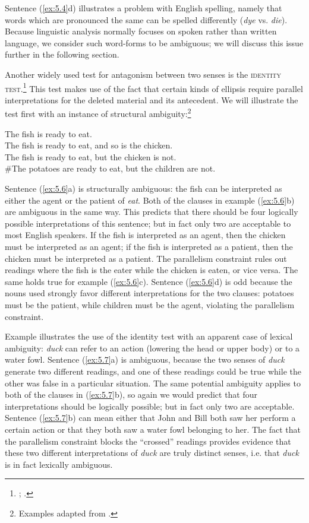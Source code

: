 Sentence (\ref{ex:5.4}d) illustrates a problem with English spelling, namely that words which are pronounced the same can be spelled differently (\textit{dye} vs. \textit{die}). Because linguistic analysis normally focuses on spoken rather than written language, we consider such word-forms to be ambiguous; we will discuss this issue further in the following section.



Another widely used test for antagonism between two senses is the \textsc{identity test}.\footnote{\citet{Lakoff1970}; \citet{ZwickySadock1975}.} This test makes use of the fact that certain kinds of ellipsis require parallel interpretations for the deleted material and its antecedent. We will illustrate the test first with an instance of structural ambiguity:\footnote{Examples adapted from \citet[512]{Kennedy2011}.}


\ea \label{ex:5.6}
\ea The fish is ready to eat.\\
\ex The fish is ready to eat, and so is the chicken.\\
\ex The fish is ready to eat, but the chicken is not.\\
\ex \#The potatoes are ready to eat, but the children are not.
                       \z
\z


Sentence (\ref{ex:5.6}a) is structurally ambiguous: the fish can be interpreted as either the agent or the patient of \textit{eat}. Both of the clauses in example (\ref{ex:5.6}b) are ambiguous in the same way. This predicts that there should be four logically possible interpretations of this sentence; but in fact only two are acceptable to most English speakers. If the fish is interpreted as an agent, then the chicken must be interpreted as an agent; if the fish is interpreted as a patient, then the chicken must be interpreted as a patient. The parallelism constraint rules out readings where the fish is the eater while the chicken is eaten, or vice versa. The same holds true for example (\ref{ex:5.6}c). Sentence (\ref{ex:5.6}d) is odd because the nouns used strongly favor different interpretations for the two clauses: potatoes must be the patient, while children must be the agent, violating the parallelism constraint.



Example  illustrates the use of the identity test with an apparent case of lexical ambiguity: \textit{duck} can refer to an action (lowering the head or upper body) or to a water fowl. Sentence (\ref{ex:5.7}a) is ambiguous, because the two senses of \textit{duck} generate two different readings, and one of these readings could be true while the other was false in a particular situation. The same potential ambiguity applies to both of the clauses in (\ref{ex:5.7}b), so again we would predict that four interpretations should be logically possible; but in fact only two are acceptable. Sentence (\ref{ex:5.7}b) can mean either that John and Bill both saw her perform a certain action or that they both saw a water fowl belonging to her. The fact that the parallelism constraint blocks the “crossed” readings provides evidence that these two different interpretations of \textit{duck} are truly distinct senses, i.e. that \textit{duck} is in fact lexically ambiguous.


